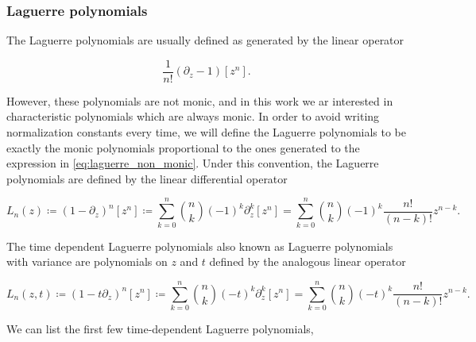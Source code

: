     



\subsubsection{Laguerre polynomials}

    The Laguerre polynomials are usually defined as generated by the linear operator

    \begin{equation} \label{eq:laguerre_non_monic}
        \frac1{n!}\left(\partial_z - 1\right)[z^n].
    \end{equation}

    However, these polynomials are not monic, and in this work we ar interested in characteristic polynomials which are always monic. In order to avoid writing normalization constants every time, we will define the Laguerre polynomials to be exactly the monic polynomials proportional to the ones generated to the expression in \eqref{eq:laguerre_non_monic}. Under this convention, the Laguerre polynomials are defined by the linear differential operator 

    \begin{equation*}
        L_n(z) \coloneqq (1 - \partial_z)^n [z^n] \coloneqq \sum_{k=0}^n \binom{n}{k} (-1)^k\partial_z^k[z^n] = \sum_{k=0}^n \binom{n}{k} (-1)^k \frac{n!}{(n-k)!} z^{n-k}. 
    \end{equation*}

    The time dependent Laguerre polynomials also known as Laguerre polynomials with variance are polynomials on $z$ and $t$ defined by the analogous linear operator

    \begin{equation*}
        L_n(z,t) \coloneqq (1 - t\partial_z)^n [z^n] \coloneqq \sum_{k=0}^n \binom{n}{k} (-t)^k\partial_z^k[z^n] = \sum_{k=0}^n \binom{n}{k} (-t)^k \frac{n!}{(n-k)!} z^{n-k}.
    \end{equation*}

    We can list the first few time-dependent Laguerre polynomials,

